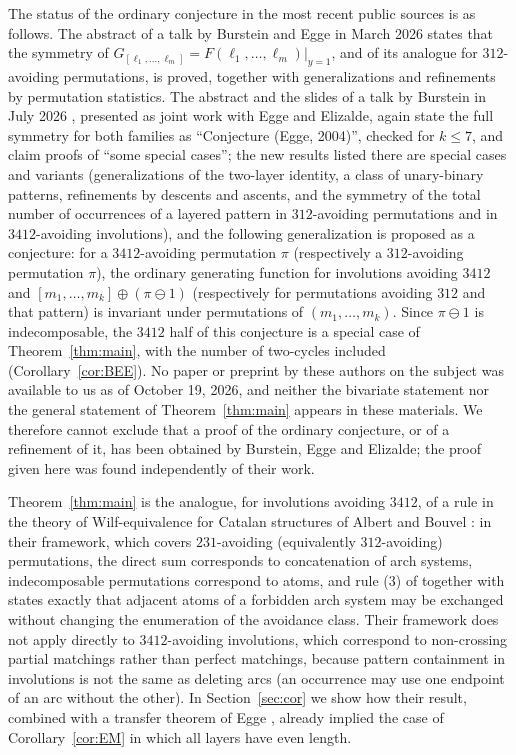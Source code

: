 \documentclass[11pt]{amsart}
\theoremstyle{definition}
\newcommand{\ds}{\oplus}
\newcommand{\sk}{\ominus}
\begin{document}
The status of the ordinary conjecture in the most recent public sources is as follows. The abstract of a talk by Burstein and Egge in March 2026 \cite{BursteinEgge2026} states that the symmetry of $G_{[\ell_1,\dots,\ell_m]}=F(\ell_1,\dots,\ell_m)|_{y=1}$, and of its analogue for $312$-avoiding permutations, is proved, together with generalizations and refinements by permutation statistics. The abstract and the slides of a talk by Burstein in July 2026 \cite{BursteinPP2026}, presented as joint work with Egge and Elizalde, again state the full symmetry for both families as ``Conjecture (Egge, 2004)'', checked for $k\le7$, and claim proofs of ``some special cases''; the new results listed there are special cases and variants (generalizations of the two-layer identity, a class of unary-binary patterns, refinements by descents and ascents, and the symmetry of the total number of occurrences of a layered pattern in $312$-avoiding permutations and in $3412$-avoiding involutions), and the following generalization is proposed as a conjecture: for a $3412$-avoiding permutation $\pi$ (respectively a $312$-avoiding permutation $\pi$), the ordinary generating function for involutions avoiding $3412$ and $[m_1,\dots,m_k]\ds(\pi\sk1)$ (respectively for permutations avoiding $312$ and that pattern) is invariant under permutations of $(m_1,\dots,m_k)$. Since $\pi\sk1$ is indecomposable, the $3412$ half of this conjecture is a special case of Theorem~\ref{thm:main}, with the number of two-cycles included (Corollary~\ref{cor:BEE}). No paper or preprint by these authors on the subject was available to us as of October 19, 2026, and neither the bivariate statement nor the general statement of Theorem~\ref{thm:main} appears in these materials. We therefore cannot exclude that a proof of the ordinary conjecture, or of a refinement of it, has been obtained by Burstein, Egge and Elizalde; the proof given here was found independently of their work.

Theorem~\ref{thm:main} is the analogue, for involutions avoiding $3412$, of a rule in the theory of Wilf-equivalence for Catalan structures of Albert and Bouvel \cite{AlbertBouvel2015}: in their framework, which covers $231$-avoiding (equivalently $312$-avoiding) permutations, the direct sum corresponds to concatenation of arch systems, indecomposable permutations correspond to atoms, and rule (3) of \cite[Definition 7]{AlbertBouvel2015} together with \cite[Theorem 8]{AlbertBouvel2015} states exactly that adjacent atoms of a forbidden arch system may be exchanged without changing the enumeration of the avoidance class. Their framework does not apply directly to $3412$-avoiding involutions, which correspond to non-crossing partial matchings rather than perfect matchings, because pattern containment in involutions is not the same as deleting arcs (an occurrence may use one endpoint of an arc without the other). In Section~\ref{sec:cor} we show how their result, combined with a transfer theorem of Egge \cite{Egge2007}, already implied the case of Corollary~\ref{cor:EM} in which all layers have even length.
\end{document}
